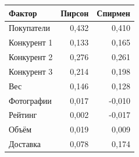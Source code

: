 \begin{tabular}{lrr}
\toprule
Фактор & Пирсон & Спирмен \\
\midrule
Покупатели & 0,432 & 0,410 \\
Конкурент 1 & 0,133 & 0,165 \\
Конкурент 2 & 0,276 & 0,261 \\
Конкурент 3 & 0,214 & 0,198 \\
Вес & 0,146 & 0,128 \\
Фотографии & 0,017 & -0,010 \\
Рейтинг & 0,002 & -0,017 \\
Объём & 0,019 & 0,009 \\
Доставка & 0,078 & 0,174 \\
\bottomrule
\end{tabular}
